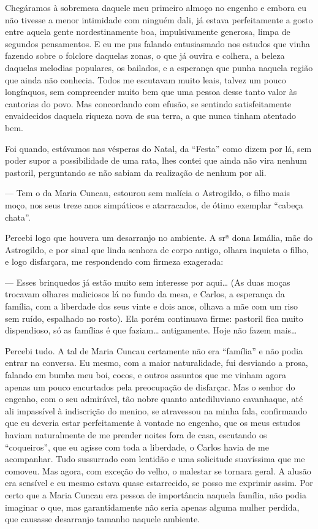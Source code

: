 \begin{linenumbers}
Chegáramos à sobremesa daquele meu primeiro almoço no engenho e embora
eu não tivesse a menor intimidade com ninguém dali, já estava
perfeitamente a gosto entre aquela gente nordestinamente boa,
impulsivamente generosa, limpa de segundos pensamentos. E eu me pus
falando entusiasmado nos estudos que vinha fazendo sobre o folclore
daquelas zonas, o que já ouvira e colhera, a beleza daquelas melodias
populares, os bailados, e a esperança que punha naquela região que ainda
não conhecia. Todos me escutavam muito leais, talvez um pouco
longínquos, sem compreender muito bem que uma pessoa desse tanto valor
às cantorias do povo. Mas concordando com efusão, se sentindo
satisfeitamente envaidecidos daquela riqueza nova de sua terra, a que
nunca tinham atentado bem.

Foi quando, estávamos nas vésperas do Natal, da ``Festa'' como dizem por
lá, sem poder supor a possibilidade de uma rata, lhes contei que ainda
não vira nenhum pastoril, perguntando se não sabiam da realização de
nenhum por ali.

--- Tem o da Maria Cuncau, estourou sem malícia o Astrogildo, o filho
mais moço, nos seus treze anos simpáticos e atarracados, de ótimo
exemplar ``cabeça chata''.

Percebi logo que houvera um desarranjo no ambiente. A srª dona Ismália,
mãe do Astrogildo, e por sinal que linda senhora de corpo antigo, olhara
inquieta o filho, e logo disfarçara, me respondendo com firmeza
exagerada:

--- Esses brinquedos já estão muito sem interesse por aqui\ldots{} (As duas
moças trocavam olhares maliciosos lá no fundo da mesa, e Carlos, a
esperança da família, com a liberdade dos seus vinte e dois anos, olhava
a mãe com um riso sem ruído, espalhado no rosto). Ela porém continuava
firme: pastoril fica muito dispendioso, só as famílias é que faziam\ldots{}
antigamente. Hoje não fazem mais\ldots{}

Percebi tudo. A tal de Maria Cuncau certamente não era ``família'' e não
podia entrar na conversa. Eu mesmo, com a maior naturalidade, fui
desviando a prosa, falando em bumba meu boi, cocos, e outros assuntos
que me vinham agora apenas um pouco encurtados pela preocupação de
disfarçar. Mas o senhor do engenho, com o seu admirável, tão nobre
quanto antediluviano cavanhaque, até ali impassível à indiscrição do
menino, se atravessou na minha fala, confirmando que eu deveria estar
perfeitamente à vontade no engenho, que os meus estudos haviam
naturalmente de me prender noites fora de casa, escutando os
``coqueiros'', que eu agisse com toda a liberdade, o Carlos havia de me
acompanhar. Tudo sussurrado com lentidão e uma solicitude suavíssima que
me comoveu. Mas agora, com exceção do velho, o malestar se tornara
geral. A alusão era sensível e eu mesmo estava quase estarrecido, se
posso me exprimir assim. Por certo que a Maria Cuncau era pessoa de
importância naquela família, não podia imaginar o que, mas
garantidamente não seria apenas alguma mulher perdida, que causasse
desarranjo tamanho naquele ambiente.


\end{linenumbers}

